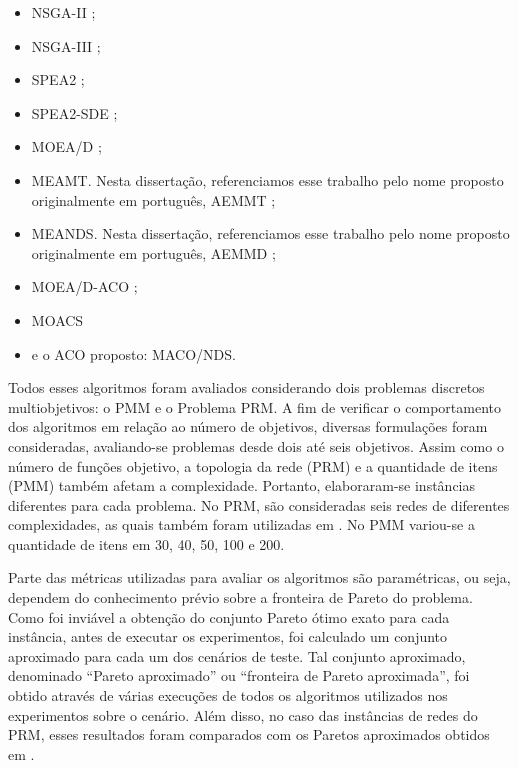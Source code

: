 \acresetall
\begin{itemize}
	\item \ac{NSGA-II} \cite{Deb2002};
	\item \ac{NSGA-III} \cite{Deb2014};
	\item \ac{SPEA2} \cite{Zitzler2002};
	\item \ac{SPEA2-SDE} \cite{Spea2SDE};
	\item \ac{MOEA/D} \cite{Zhang2007};
	\item \ac{MEAMT}. Nesta dissertação, referenciamos esse trabalho pelo nome proposto originalmente em português, \ac{AEMMT} \cite{Brasil2013};
	\item \ac{MEANDS}. Nesta dissertação, referenciamos esse trabalho pelo nome proposto originalmente em português, \ac{AEMMD} \cite{Lafeta2017};
	\item \ac{MOEA/D-ACO} \cite{Ke2013};
	\item \ac{MOACS} \cite{Riveros2016}
	\item e o ACO proposto: \ac{MACO/NDS}.
\end{itemize}

Todos esses algoritmos foram avaliados considerando dois problemas discretos multiobjetivos: o \ac{PMM} e o Problema \ac{PRM}. A fim  de verificar o comportamento dos algoritmos em relação ao número de objetivos, diversas formulações foram consideradas, avaliando-se problemas desde dois até seis objetivos. Assim como o número de funções objetivo, a topologia da rede (PRM) e a quantidade de itens (PMM) também afetam a complexidade. Portanto, elaboraram-se instâncias diferentes para cada problema. No PRM, são consideradas seis redes de diferentes complexidades, as quais também foram utilizadas em \cite{LafetaThesis}. No PMM variou-se a quantidade de itens em 30, 40, 50, 100 e 200.

Parte das métricas utilizadas para avaliar os algoritmos são paramétricas, ou seja, dependem do conhecimento prévio sobre a fronteira de Pareto do problema. Como foi inviável a obtenção do conjunto Pareto ótimo exato para cada instância, antes de executar os experimentos, foi calculado um conjunto aproximado para cada um dos cenários de teste. Tal conjunto aproximado, denominado ``Pareto aproximado'' ou ``fronteira de Pareto aproximada'', foi obtido através de várias execuções de todos os algoritmos utilizados nos experimentos sobre o cenário. Além disso, no caso das instâncias de redes do PRM, esses resultados foram comparados com os Paretos aproximados obtidos em \cite{Lafeta2017}.

